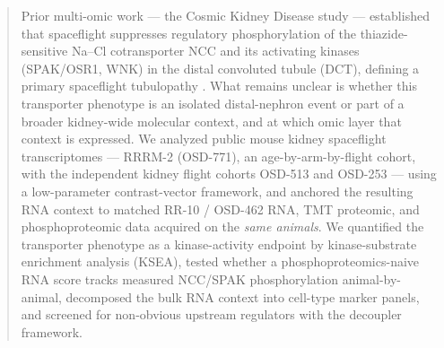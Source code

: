 \documentclass[11pt]{article}
\begin{document}
\begin{abstract}
\noindent
Prior multi-omic work --- the Cosmic Kidney Disease study --- established that spaceflight suppresses regulatory phosphorylation of the thiazide-sensitive Na--Cl cotransporter NCC and its activating kinases (SPAK/OSR1, WNK) in the distal convoluted tubule (DCT), defining a primary spaceflight tubulopathy \citep{siew2024cosmic}. What remains unclear is whether this transporter phenotype is an isolated distal-nephron event or part of a broader kidney-wide molecular context, and at which omic layer that context is expressed. We analyzed public mouse kidney spaceflight transcriptomes --- RRRM-2 (OSD-771), an age-by-arm-by-flight cohort, with the independent kidney flight cohorts OSD-513 and OSD-253 --- using a low-parameter contrast-vector framework, and anchored the resulting RNA context to matched RR-10 / OSD-462 RNA, TMT proteomic, and phosphoproteomic data acquired on the \emph{same animals}. We quantified the transporter phenotype as a kinase-activity endpoint by kinase-substrate enrichment analysis (KSEA), tested whether a phosphoproteomics-naive RNA score tracks measured NCC/SPAK phosphorylation animal-by-animal, decomposed the bulk RNA context into cell-type marker panels, and screened for non-obvious upstream regulators with the decoupler framework.


\end{abstract}
\end{document}
